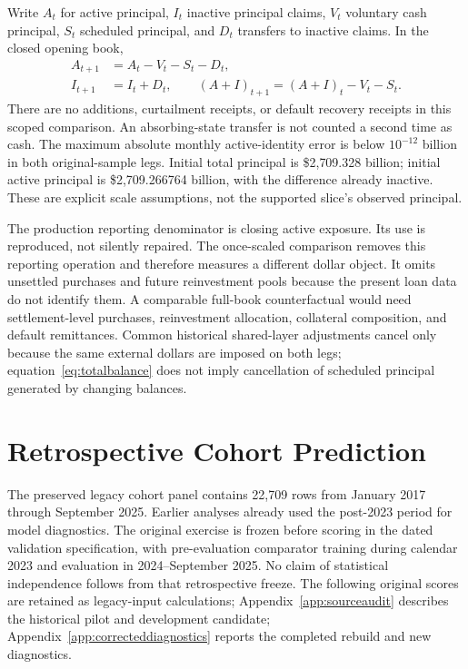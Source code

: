 Write $A_t$ for active principal, $I_t$ inactive principal claims, $V_t$ voluntary cash principal, $S_t$ scheduled principal, and $D_t$ transfers to inactive claims. In the closed opening book,
\begin{align}
A_{t+1}&=A_t-V_t-S_t-D_t,\label{eq:activebalance}\\
I_{t+1}&=I_t+D_t,\qquad
(A+I)_{t+1}=(A+I)_t-V_t-S_t.\label{eq:totalbalance}
\end{align}
There are no additions, curtailment receipts, or default recovery receipts in this scoped comparison. An absorbing-state transfer is not counted a second time as cash. The maximum absolute monthly active-identity error is below $10^{-12}$ billion in both original-sample legs. Initial total principal is \$2{,}709.328 billion; initial active principal is \$2{,}709.266764 billion, with the difference already inactive. These are explicit scale assumptions, not the supported slice's observed principal.

The production reporting denominator is closing active exposure. Its use is reproduced, not silently repaired. The once-scaled comparison removes this reporting operation and therefore measures a different dollar object. It omits unsettled purchases and future reinvestment pools because the present loan data do not identify them. A comparable full-book counterfactual would need settlement-level purchases, reinvestment allocation, collateral composition, and default remittances. Common historical shared-layer adjustments cancel only because the same external dollars are imposed on both legs; equation~\eqref{eq:totalbalance} does not imply cancellation of scheduled principal generated by changing balances.

\section{Retrospective Cohort Prediction}\label{app:validation}

The preserved legacy cohort panel contains 22,709 rows from January 2017 through September 2025. Earlier analyses already used the post-2023 period for model diagnostics. The original exercise is frozen before scoring in the dated validation specification, with pre-evaluation comparator training during calendar 2023 and evaluation in 2024--September 2025. No claim of statistical independence follows from that retrospective freeze. The following original scores are retained as legacy-input calculations; Appendix~\ref{app:sourceaudit} describes the historical pilot and development candidate; Appendix~\ref{app:correcteddiagnostics} reports the completed rebuild and new diagnostics.

